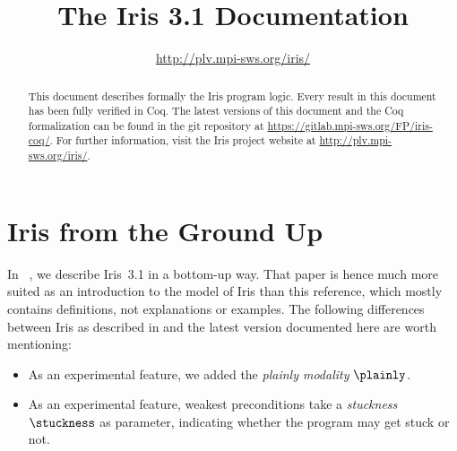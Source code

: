 \documentclass[10pt]{article}
\title{\bfseries The Iris 3.1 Documentation}
\author{\url{http://plv.mpi-sws.org/iris/}}
\begin{document}
\maketitle
\thispagestyle{empty}
\vfill
\begin{abstract}
This document describes formally the Iris program logic.
Every result in this document has been fully verified in Coq.
The latest versions of this document and the Coq formalization can be found in the git repository at \url{https://gitlab.mpi-sws.org/FP/iris-coq/}.
For further information, visit the Iris project website at \url{http://plv.mpi-sws.org/iris/}.
\end{abstract}

\clearpage\begingroup
\tableofcontents
\endgroup

\clearpage\begingroup
\section{Iris from the Ground Up}
In ~\cite{iris-ground-up}, we describe Iris~3.1 in a bottom-up way.
That paper is hence much more suited as an introduction to the model of Iris than this reference, which mostly contains definitions, not explanations or examples.
The following differences between Iris as described in  and the latest version documented here are worth mentioning:
\begin{itemize}
\item As an experimental feature, we added the \emph{plainly modality} $\plainly$.
\item As an experimental feature, weakest preconditions take a \emph{stuckness} $\stuckness$ as parameter, indicating whether the program may get stuck or not.
\end{itemize}
\endgroup

\clearpage\begingroup

\endgroup
\clearpage\begingroup

\endgroup
\clearpage\begingroup

\endgroup
\clearpage\begingroup

\endgroup
\clearpage\begingroup

\endgroup
\clearpage\begingroup

\endgroup
\clearpage\begingroup

\endgroup
\clearpage\begingroup

\endgroup
\clearpage\begingroup

\endgroup
\clearpage\begingroup
\printbibliography
\endgroup
\end{document}
